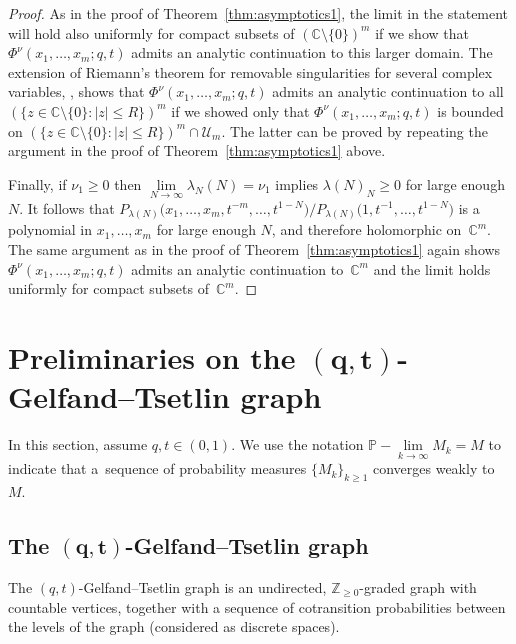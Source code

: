 \documentclass[pdftex]{sigma}
\numberwithin{equation}{section}
\newcommand{\C}{\mathbb{C}}
\newcommand{\Z}{\mathbb{Z}}
\newcommand{\U}{\mathcal{U}}
\begin{document}
\begin{proof}
As in the proof of Theorem~\ref{thm:asymptotics1}, the limit in the statement will hold also uniformly for compact subsets of $(\C\setminus\{0\})^m$ if we show that $\Phi^{\nu}(x_1, \dots, x_m; q, t)$ admits an analytic continuation to this larger domain. The extension of Riemann's theorem for removable singularities for several complex variables, \cite[Theorem~8]{R}, shows that $\Phi^{\nu}(x_1, \dots, x_m; q, t)$ admits an analytic continuation to all $\left(\{z\in\C \setminus\{0\}\colon |z| \leq R\}\right)^m$ if we showed only that $\Phi^{\nu}(x_1, \dots, x_m; q, t)$ is bounded on $(\{z\in\C\setminus\{0\}\colon |z|\leq R\})^m\cap\U_m$. The latter can be proved by repeating the argument in the proof of Theorem~\ref{thm:asymptotics1} above.

Finally, if $\nu_1 \geq 0$ then $\lim\limits_{N\rightarrow\infty}{\lambda_N(N)} = \nu_1$ implies $\lambda(N)_N \geq 0$ for large enough $N$. It follows that $P_{\lambda(N)}\big(x_1, \dots, x_m, t^{-m}, \dots, t^{1-N}\big)/P_{\lambda(N)}\big(1, t^{-1}, \dots, t^{1-N}\big)$ is a polynomial in $x_1, \dots, x_m$ for large enough $N$, and therefore holomorphic on~$\C^m$. The same argument as in the proof of Theorem~\ref{thm:asymptotics1} again shows $\Phi^{\nu}(x_1, \dots, x_m; q, t)$ admits an analytic continuation to~$\C^m$ and the limit holds uniformly for compact subsets of~$\C^m$.
\end{proof}

\section[Preliminaries on the $(q, t)$-Gelfand--Tsetlin graph]{Preliminaries on the $\boldsymbol{(q, t)}$-Gelfand--Tsetlin graph}\label{sec:qtpreliminaries}

In this section, assume $q, t\in (0, 1)$. We use the notation $\mathbb{P}-\lim\limits_{k\rightarrow\infty}M_k = M$ to indicate that a~sequence of probability measures $\{M_k\}_{k \geq 1}$ converges weakly to~$M$.

\subsection[The $(q, t)$-Gelfand--Tsetlin graph]{The $\boldsymbol{(q, t)}$-Gelfand--Tsetlin graph}\label{sec:qtGT}

The $(q, t)$-Gelfand--Tsetlin graph is an undirected, $\Z_{\geq 0}$-graded graph with countable vertices, together with a sequence of cotransition probabilities between the levels of the graph (considered as discrete spaces).
\end{document}

